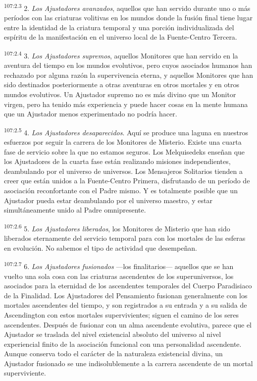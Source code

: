 \documentclass[twoside, 11pt]{book}
\begin{document}
\par
\textsuperscript{107:2.3} 2. \textit{Los Ajustadores avanzados}, aquellos que han servido durante uno o más períodos con las criaturas volitivas en los mundos donde la fusión final tiene lugar entre la identidad de la criatura temporal y una porción individualizada del espíritu de la manifestación en el universo local de la Fuente-Centro Tercera.

\par
\textsuperscript{107:2.4} 3. \textit{Los Ajustadores supremos}, aquellos Monitores que han servido en la aventura del tiempo en los mundos evolutivos, pero cuyos asociados humanos han rechazado por alguna razón la supervivencia eterna, y aquellos Monitores que han sido destinados posteriormente a otras aventuras en otros mortales y en otros mundos evolutivos. Un Ajustador supremo no es más divino que un Monitor virgen, pero ha tenido más experiencia y puede hacer cosas en la mente humana que un Ajustador menos experimentado no podría hacer.

\par
\textsuperscript{107:2.5} 4. \textit{Los Ajustadores desaparecidos}. Aquí se produce una laguna en nuestros esfuerzos por seguir la carrera de los Monitores de Misterio. Existe una cuarta fase de servicio sobre la que no estamos seguros. Los Melquisedeks enseñan que los Ajustadores de la cuarta fase están realizando misiones independientes, deambulando por el universo de universos. Los Mensajeros Solitarios tienden a creer que están unidos a la Fuente-Centro Primera, disfrutando de un período de asociación reconfortante con el Padre mismo. Y es totalmente posible que un Ajustador pueda estar deambulando por el universo maestro, y estar simultáneamente unido al Padre omnipresente.

\par
\textsuperscript{107:2.6} 5. \textit{Los Ajustadores liberados}, los Monitores de Misterio que han sido liberados eternamente del servicio temporal para con los mortales de las esferas en evolución. No sabemos el tipo de actividad que desempeñan.

\par
\textsuperscript{107:2.7} 6. \textit{Los Ajustadores fusionados} ---los finalitarios--- aquellos que se han vuelto una sola cosa con las criaturas ascendentes de los superuniversos, los asociados para la eternidad de los ascendentes temporales del Cuerpo Paradisiaco de la Finalidad. Los Ajustadores del Pensamiento fusionan generalmente con los mortales ascendentes del tiempo, y son registrados a su entrada y a su salida de Ascendington con estos mortales supervivientes; siguen el camino de los seres ascendentes. Después de fusionar con un alma ascendente evolutiva, parece que el Ajustador se traslada del nivel existencial absoluto del universo al nivel experiencial finito de la asociación funcional con una personalidad ascendente. Aunque conserva todo el carácter de la naturaleza existencial divina, un Ajustador fusionado se une indisolublemente a la carrera ascendente de un mortal superviviente.
\end{document}
